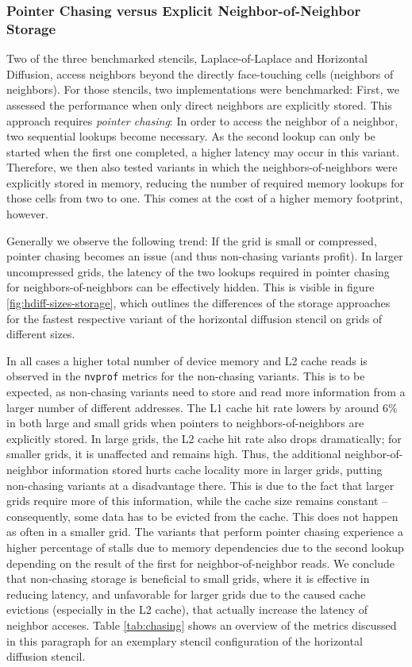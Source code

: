 \subsubsection{Pointer Chasing versus Explicit Neighbor-of-Neighbor Storage}
\label{sec:results-chasing}

Two of the three benchmarked stencils, Laplace-of-Laplace and Horizontal Diffusion, access neighbors beyond the directly face-touching cells (neighbors of neighbors). For those stencils, two implementations were benchmarked: First, we assessed the performance when only direct neighbors are explicitly stored. This approach requires \emph{pointer chasing}: In order to access the neighbor of a neighbor, two sequential lookups become necessary. As the second lookup can only be started when the first one completed, a higher latency may occur in this variant. Therefore, we then also tested variants in which the neighbors-of-neighbors were explicitly stored in memory, reducing the number of required memory lookups for those cells from two to one. This comes at the cost of a higher memory footprint, however.

Generally we observe the following trend: If the grid is small or compressed, pointer chasing becomes an issue (and thus non-chasing variants profit). In larger uncompressed grids, the latency of the two lookups required in pointer chasing for neighbors-of-neighbors can be effectively hidden. This is visible in figure \ref{fig:hdiff-sizes-storage}, which outlines the differences of the storage approaches for the fastest respective variant of the horizontal diffusion stencil on grids of different sizes. 

In all cases a higher total number of device memory and L2 cache reads is observed in the \texttt{nvprof} metrics for the non-chasing variants. This is to be expected, as non-chasing variants need to store and read more information from a larger number of different addresses. The L1 cache hit rate lowers by around $6\%$ in both large and small grids when pointers to neighbors-of-neighbors are explicitly stored. In large grids, the L2 cache hit rate also drops dramatically; for smaller grids, it is unaffected and remains high. Thus, the additional neighbor-of-neighbor information stored hurts cache locality more in larger grids, putting non-chasing variants at a disadvantage there. This is due to the fact that larger grids require more of this information, while the cache size remains constant -- consequently, some data has to be evicted from the cache. This does not happen as often in a smaller grid. The variants that perform pointer chasing experience a higher percentage of stalls due to memory dependencies due to the second lookup depending on the result of the first for neighbor-of-neighbor reads.  We conclude that non-chasing storage is beneficial to small grids, where it is effective in reducing latency, and unfavorable for larger grids due to the caused cache evictions (especially in the L2 cache), that actually increase the latency of neighbor acceses. Table \ref{tab:chasing} shows an overview of the metrics discussed in this paragraph for an exemplary stencil configuration of the horizontal diffusion stencil.

